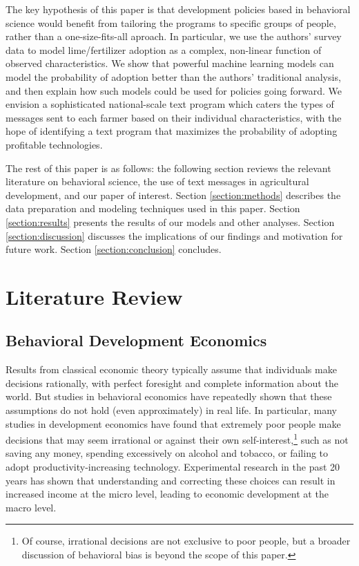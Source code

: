 \documentclass[12pt]{article}
\begin{document}
The key hypothesis of this paper is that development policies based in behavioral science would benefit from tailoring the programs to specific groups of people, rather than a one-size-fits-all aproach. In particular, we use the authors' survey data to model lime/fertilizer adoption as a complex, non-linear function of observed characteristics. We show that powerful machine learning models can model the probability of adoption better than the authors' traditional analysis, and then explain how such models could be used for policies going forward. We envision a sophisticated national-scale text program which caters the types of messages sent to each farmer based on their individual characteristics, with the hope of identifying a text program that maximizes the probability of adopting profitable technologies.

The rest of this paper is as follows: the following section reviews the relevant literature on behavioral science, the use of text messages in agricultural development, and our paper of interest. Section \ref{section:methods} describes the data preparation and modeling techniques used in this paper. Section \ref{section:results} presents the results of our models and other analyses. Section \ref{section:discussion} discusses the implications of our findings and motivation for future work. Section \ref{section:conclusion} concludes.

\section{Literature Review}
\label{section:litreview}

\subsection{Behavioral Development Economics}
Results from classical economic theory typically assume that individuals make decisions rationally, with perfect foresight and complete information about the world. But studies in behavioral economics have repeatedly shown that these assumptions do not hold (even approximately) in real life. In particular, many studies in development economics have found that extremely poor people make decisions that may seem irrational or against their own self-interest,\footnote{Of course, irrational decisions are not exclusive to poor people, but a broader discussion of behavioral bias is beyond the scope of this paper.} such as not saving any money, spending excessively on alcohol and tobacco, or failing to adopt productivity-increasing technology. Experimental research in the past 20 years has shown that understanding and correcting these choices can result in increased income at the micro level, leading to economic development at the macro level.
\end{document}
